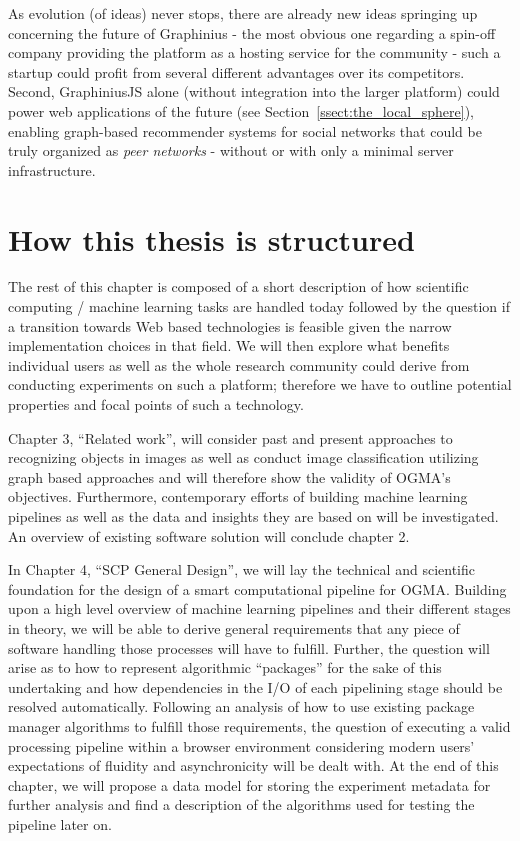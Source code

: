 As evolution (of ideas) never stops, there are already new ideas springing up concerning the future of Graphinius - the most obvious one regarding a spin-off company providing the platform as a hosting service for the community - such a startup could profit from several different advantages over its competitors. Second, GraphiniusJS alone (without integration into the larger platform) could power web applications of the future (see Section~\ref{ssect:the_local_sphere}), enabling graph-based recommender systems for social networks that could be truly organized as \textit{peer networks} - without or with only a minimal server infrastructure.


\section{How this thesis is structured}
\label{section:thesis_structure}

The rest of this chapter is composed of a short description of how scientific computing / machine learning tasks are handled today followed by the question if a transition towards Web based technologies is feasible given the narrow implementation choices in that field. We will then explore what benefits individual users as well as the whole research community could derive from conducting experiments on such a platform; therefore we have to outline potential properties and focal points of such a technology. 


Chapter 3, ``Related work'', will consider past and present approaches to recognizing objects in images as well as conduct image classification utilizing graph based approaches and will therefore show the validity of OGMA's objectives. Furthermore, contemporary efforts of building machine learning pipelines as well as the data and insights they are based on will be investigated. An overview of existing software solution will conclude chapter 2.

\par

In Chapter 4, ``SCP General Design'', we will lay the technical and scientific foundation for the design of a smart computational pipeline for OGMA. Building upon a high level overview of machine learning pipelines and their different stages in theory, we will be able to derive general requirements that any piece of software handling those processes will have to fulfill. Further, the question will arise as to how to represent algorithmic ``packages'' for the sake of this undertaking and how dependencies in the I/O of each pipelining stage should be resolved automatically. Following an analysis of how to use existing package manager algorithms to fulfill those requirements, the question of executing a valid processing pipeline within a browser environment considering modern users' expectations of fluidity and asynchronicity will be dealt with. At the end of this chapter, we will propose a data model for storing the experiment metadata for further analysis and find a description of the algorithms used for testing the pipeline later on.

